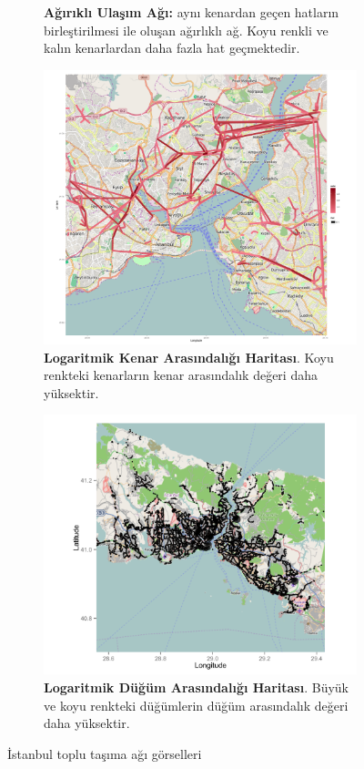 \documentclass[10pt,a4paper,twocolumn]{article}
\begin{document}
\begin{figure}
\begin{subfigure}{.45\textwidth}
  \caption{\textbf{Ağırıklı Ulaşım Ağı:} aynı kenardan geçen hatların birleştirilmesi ile oluşan ağırlıklı ağ. Koyu renkli ve kalın kenarlardan daha fazla hat geçmektedir.}
  \label{fig:weightedgraph}
\end{subfigure}
\begin{subfigure}{.5\textwidth}
\hspace{0.4mm}
  \includegraphics[width=0.94\linewidth]{img/map3-edge-betweenness.png}
  \caption{\textbf{Logaritmik Kenar Arasındalığı Haritası}. Koyu
   renkteki kenarların kenar arasındalık değeri daha yüksektir.}
  \label{fig:edgebetweenness}
\end{subfigure}
\begin{subfigure}{.5\textwidth}
  \includegraphics[width=\linewidth]{img/map4-node-betweenness.png}
  \caption{\textbf{Logaritmik Düğüm Arasındalığı Haritası}. Büyük ve koyu renkteki düğümlerin düğüm arasındalık değeri daha yüksektir.}
  \label{fig:node-betweenness}
\end{subfigure}
\caption{İstanbul toplu taşıma ağı görselleri}
\label{fig:fig}
\end{figure}
\end{document}

